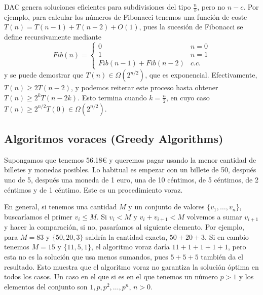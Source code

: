 \documentclass[AL.tex]{subfiles}
\begin{document}
\begin{nota}
DAC genera soluciones eficientes para subdivisiones del tipo $\frac{n}{b}$, pero no $n-c$. Por ejemplo, para calcular los números de Fibonacci tenemos una función de coste $T(n)=T(n-1)+T(n-2)+O(1)$, pues la sucesión de Fibonacci se define recursivamente mediante
\[
Fib(n)=\begin{cases}
0 & n=0\\
1 & n=1\\
Fib(n-1)+Fib(n-2) & c.c.
\end{cases}
\]
y se puede demostrar que $T(n)\in\Omega(2^{n/2})$, que es exponencial. Efectivamente, $T(n)\geq 2T(n-2)$, y podemos reiterar este proceso hasta obtener $T(n)\geq 2^kT(n-2k)$. Esto termina cuando $k=\frac{n}{2}$, en cuyo caso $T(n)\geq 2^{n/2}T(0)\in\Omega(2^{n/2})$. 
\end{nota}

\subsection{Algoritmos voraces (Greedy Algorithms)}
Supongamos que tenemos 56.18€  y queremos pagar usando la menor cantidad de billetes y monedas posibles. Lo habitual es empezar con un billete de 50, después uno de 5, después una moneda de 1 euro, una de 10 céntimos, de 5 céntimos, de 2 céntimos y de 1 céntimo. Este es un procedimiento voraz. 

En general, si tenemos una cantidad $M$ y un conjunto de valores $\{v_1,\dots, v_n\}$, buscaríamos el primer $v_i\leq M$. Si $v_i<M$ y $v_i+v_{i+1}<M$ volvemos a sumar $v_{i+1}$ y hacer la comparación, si no, pasaríamos al siguiente elemento. Por ejemplo, para $M=83$ y $\{50,20,3\}$ saldría la cantidad exacta, $50+20+3$. Si en cambio tenemos $M=15$ y $\{11,5,1\}$, el algoritmo voraz daría $11+1+1+1+1$, pero esta no es la solución que usa menos sumandos, pues $5+5+5$ también da el resultado. Esto muestra que el algoritmo voraz no garantiza la solución óptima en todos los casos. Un caso en el que si es en el que tenemos un número $p>1$ y los elementos del conjunto son $1,p,p^2,\dots, p^n$, $n>0$. 
\end{document}
